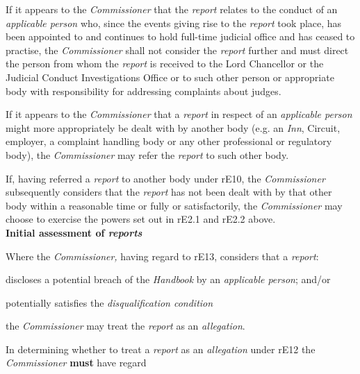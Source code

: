 \par
{}\par
If it appears to the \emph{Commissioner} that the \emph{report} relates
to the conduct of an \emph{applicable person} who, since the events
giving rise to the \emph{report} took place, has been appointed to and
continues to hold full-time judicial office and has ceased to practise,
the \emph{Commissioner} shall not consider the \emph{report} further and
must direct the person from whom the \emph{report} is received to the
Lord Chancellor or the Judicial Conduct Investigations Office or to such
other person or appropriate body with responsibility for addressing
complaints about judges.\\
\par
{}\par
If it appears to the \emph{Commissioner} that a \emph{report} in respect
of an \emph{applicable person} might more appropriately be dealt with by
another body (e.g. an \emph{Inn}, Circuit, employer, a complaint
handling body or any other professional or regulatory body),
the \emph{Commissioner} may refer the \emph{report} to such other
body.\\
\par
If, having referred a \emph{report} to another body under rE10,
the \emph{Commissioner} subsequently considers that
the \emph{report }has not been dealt with by that other body within a
reasonable time or fully or satisfactorily, the \emph{Commissioner} may
choose to exercise the powers set out in rE2.1 and rE2.2 above.\\
\textbf{Initial assessment of \emph{reports}}\par
{}\par
Where the \emph{Commissioner, }having regard to rE13, considers that
a \emph{report}:\\\nl \item discloses a potential breach of the \emph{Handbook }by
an \emph{applicable person}; and/or\item potentially satisfies the \emph{disqualification condition}\par
the \emph{Commissioner} may treat the \emph{report} as
an \emph{allegation}.\ln
{}\par
In determining whether to treat a \emph{report }as
an \emph{allegation} under rE12 the \emph{Commissioner}  \textcolor{myred}{\textbf{must}} have regard
